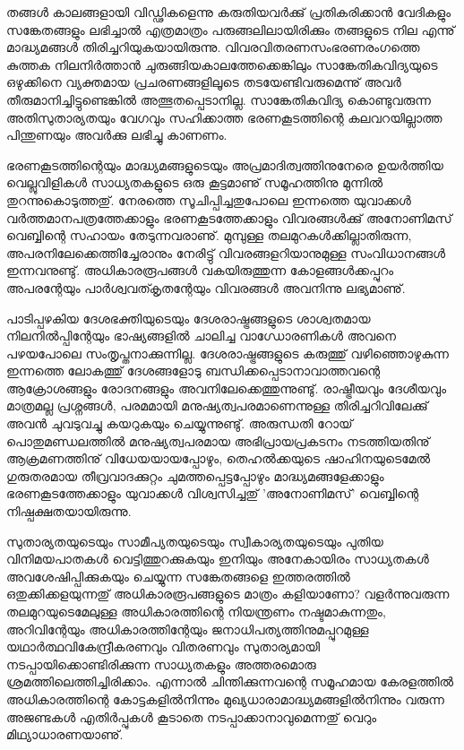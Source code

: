 തങ്ങള്‍ കാലങ്ങളായി വിഡ്ഢികളെന്നു കരുതിയവര്‍ക്കു് പ്രതികരിക്കാന്‍ വേദികളും സങ്കേതങ്ങളും ലഭിച്ചാല്‍ എത്രമാത്രം 
പരുങ്ങലിലായിരിക്കും തങ്ങളുടെ നില എന്നു് മാദ്ധ്യമങ്ങള്‍ തിരിച്ചറിയുകയായിരുന്നു. വിവരവിതരണസംഭരണരംഗത്തെ 
കുത്തക നിലനിര്‍ത്താന്‍ ചുരുങ്ങിയകാലത്തേക്കെങ്കിലും സാങ്കേതികവിദ്യയുടെ ഒഴുക്കിനെ വ്യക്തമായ പ്രചരണങ്ങളിലൂടെ 
തടയേണ്ടിവരുമെന്നു് അവര്‍ തീരുമാനിച്ചിട്ടുണ്ടെങ്കില്‍ അത്ഭുതപ്പെടാനില്ല. സാങ്കേതികവിദ്യ കൊണ്ടുവരുന്ന അതിസുതാര്യതയും 
വേഗവും സഹിക്കാത്ത ഭരണകൂടത്തിന്റെ കലവറയില്ലാത്ത പിന്തുണയും അവര്‍ക്കു ലഭിച്ചു കാണണം.

ഭരണകൂടത്തിന്റെയും മാദ്ധ്യമങ്ങളുടെയും അപ്രമാദിത്വത്തിനുനേരെ ഉയര്‍ത്തിയ വെല്ലുവിളികള്‍ സാധ്യതകളുടെ ഒരു കൂട്ടമാണു് സമൂഹത്തിനു 
മുന്നില്‍ തുറന്നുകൊടുത്തതു്. നേരത്തെ സൂചിപ്പിച്ചതുപോലെ ഇന്നത്തെ യുവാക്കള്‍ വര്‍ത്തമാനപത്രത്തേക്കാളും ഭരണകൂടത്തേക്കാളും 
വിവരങ്ങള്‍ക്കു് അനോണിമസ് വെബ്ബിന്റെ സഹായം തേടുന്നവരാണു്. മുമ്പുള്ള തലമുറകള്‍ക്കില്ലാതിരുന്ന, അപരനിലേക്കെത്തിച്ചേരാനും 
നേരിട്ടു് വിവരങ്ങളറിയാനുമുള്ള സംവിധാനങ്ങള്‍ ഇന്നവനുണ്ടു്. അധികാരരൂപങ്ങള്‍ വകയിരുത്തുന്ന കോളങ്ങള്‍ക്കപ്പുറം അപരന്റേയും 
പാര്‍ശ്വവത്കൃതന്റേയും വിവരങ്ങള്‍ അവനിന്നു ലഭ്യമാണു്.

പാടിപ്പഴകിയ ദേശഭക്തിയുടെയും ദേശരാഷ്ട്രങ്ങളുടെ ശാശ്വതമായ നിലനില്‍പ്പിന്റേയും ഭാഷ്യങ്ങളില്‍ ചാലിച്ച വാഗ്ധോരണികള്‍ 
അവനെ പഴയപോലെ സംതൃപ്തനാക്കുന്നില്ല. ദേശരാഷ്ട്രങ്ങളുടെ കരുത്തു് വഴിഞ്ഞൊഴുകുന്ന ഇന്നത്തെ ലോകത്തു് 
ദേശങ്ങളോടു ബന്ധിക്കപ്പെടാനാവാത്തവന്റെ ആക്രോശങ്ങളും രോദനങ്ങളും അവനിലേക്കെത്തുന്നുണ്ടു്. രാഷ്ട്രീയവും ദേശീയവും
മാത്രമല്ല പ്രശ്നങ്ങള്‍, പരമമായി മനുഷ്യത്വപരമാണെന്നുള്ള തിരിച്ചറിവിലേക്കു് അവന്‍ ചുവടുവച്ചു കയറുകയും ചെയ്യുന്നുണ്ടു്.
 അരുന്ധതി റോയ് പൊതുമണ്ഡലത്തില്‍ മനുഷ്യത്വപരമായ അഭിപ്രായപ്രകടനം നടത്തിയതിനു് ആക്രമണത്തിനു് വിധേയയായപ്പോഴും, 
തെഹല്‍ക്കയുടെ ഷാഹിനയുടെമേല്‍ ഗുരുതരമായ തീവ്രവാദക്കുറ്റം ചുമത്തപ്പെട്ടപ്പോഴും മാദ്ധ്യമങ്ങളേക്കാളും ഭരണകൂടത്തേക്കാളും 
യുവാക്കള്‍ വിശ്വസിച്ചതു് 'അനോണിമസ്' വെബ്ബിന്റെ നിഷ്പക്ഷതയായിരുന്നു.

സുതാര്യതയുടെയും സാമീപ്യതയുടെയും സ്വീകാര്യതയുടെയും പുതിയ വിനിമയപാതകള്‍ വെട്ടിത്തുറക്കുകയും ഇനിയും അനേകായിരം 
സാധ്യതകള്‍ അവശേഷിപ്പിക്കുകയും ചെയ്യുന്ന സങ്കേതങ്ങളെ ഇത്തരത്തില്‍ ഒതുക്കിക്കളയുന്നതു് അധികാരരൂപങ്ങളുടെ മാത്രം 
കളിയാണോ? വളര്‍ന്നുവരുന്ന തലമുറയുടെമേലുള്ള അധികാരത്തിന്റെ നിയന്ത്രണം നഷ്ടമാകുന്നതും, അറിവിന്റേയും അധികാരത്തിന്റേയും
 ജനാധിപത്യത്തിനുമപ്പുറമുള്ള യഥാര്‍ത്ഥവികേന്ദ്രീകരണവും വിതരണവും സുതാര്യമായി നടപ്പായിക്കൊണ്ടിരിക്കുന്ന സാധ്യതകളും 
അത്തരമൊരു ശ്രമത്തിലെത്തിച്ചിരിക്കാം. എന്നാല്‍ ചിന്തിക്കുന്നവന്റെ സമൂഹമായ കേരളത്തില്‍ അധികാരത്തിന്റെ കോട്ടകളില്‍നിന്നും 
മുഖ്യധാരാമാദ്ധ്യമങ്ങളില്‍നിന്നും വരുന്ന അജണ്ടകള്‍ എതിര്‍പ്പുകള്‍ കൂടാതെ നടപ്പാക്കാനാവുമെന്നതു് വെറും മിഥ്യാധാരണയാണു്. ‌

